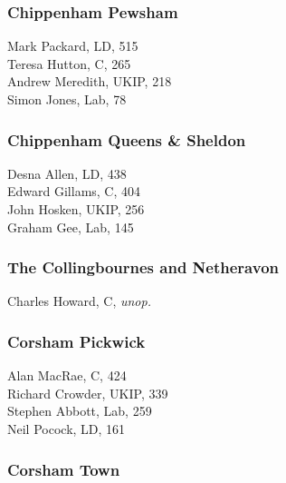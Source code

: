 \documentclass[a4paper,openany,10pt]{book}
\begin{document}
\subsubsection*{Chippenham Pewsham}



Mark Packard, LD, 515\\
Teresa Hutton, C, 265\\
Andrew Meredith, UKIP, 218\\
Simon Jones, Lab, 78\\


\subsubsection*{Chippenham Queens \& Sheldon}



Desna Allen, LD, 438\\
Edward Gillams, C, 404\\
John Hosken, UKIP, 256\\
Graham Gee, Lab, 145\\


\subsubsection*{The Collingbournes and Netheravon}



Charles Howard, C, \emph{unop.}\\


\subsubsection*{Corsham Pickwick}



Alan MacRae, C, 424\\
Richard Crowder, UKIP, 339\\
Stephen Abbott, Lab, 259\\
Neil Pocock, LD, 161\\


\subsubsection*{Corsham Town}
\end{document}
